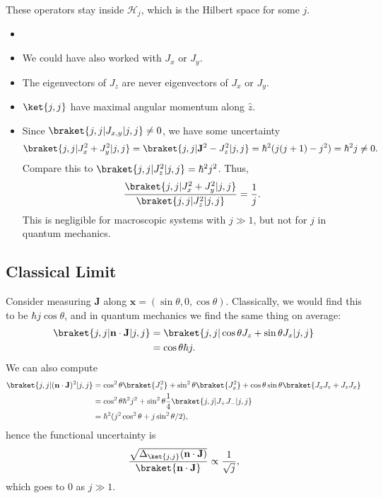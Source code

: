 \documentclass[12pt]{article}
\begin{document}
These operators stay inside $\mathcal{H}_j$, which is the Hilbert space for some $j$.

\begin{remark}
	\begin{itemize}
		\item[]
		\item We could have also worked with $J_x$ or $J_y$.
		\item The eigenvectors of $J_z$ are never eigenvectors of $J_x$ or $J_y$.
		\item $\ket{j,j}$ have maximal angular momentum along $\hat z$.
		\item Since $\braket{j,j|J_{x,y}|j,j} \neq 0$, we have some uncertainty
			\[
				\braket{j,j|J_x^2+J_y^2|j,j} = \braket{j,j|\mathbf{J}^2-J_z^2|j,j} = \hbar^2(j(j+1)-j^2) = \hbar^2j \neq 0.
			\]
			Compare this to $\braket{j,j|J_z^2|j,j} = \hbar^2 j^2$. Thus,
			\[
				\frac{\braket{j,j|J_x^2+J_y^2|j,j}}{\braket{j,j|J_z^2|j,j}} = \frac{1}{j}.
			\]
			This is negligible for macroscopic systems with $j \gg 1$, but not for $j$ in quantum mechanics.
	\end{itemize}	
\end{remark}

\subsection{Classical Limit}
\label{sub:classical_lim}

Consider measuring $\mathbf{J}$ along $\mathbf{x} = (\sin\theta, 0, \cos\theta)$. Classically, we would find this to be $\hbar j \cos \theta$, and in quantum mechanics we find the same thing on average:
\begin{align*}
	\braket{j,j|\mathbf{n} \cdot \mathbf{J} | j,j} &= \braket{j,j|\cos\theta J_z + \sin\theta J_x|j,j} \\
						       &= \cos \theta \hbar j.
\end{align*}
We can also compute
\begin{align*}
	\braket{j,j|(\mathbf{n} \cdot \mathbf{J})^2|j,j} &= \cos^2\theta \braket{J_z^2} + \sin^2\theta \braket{J_x^2} + \cos \theta \sin \theta \braket{J_xJ_z+J_zJ_x} \\
							 &= \cos^2\theta \hbar^2 j^2 + \sin^2\theta \frac{1}{4} \braket{j,j|J_{+}J_{-}|j,j} \\
							 &= \hbar^2(j^2 \cos^2\theta + j \sin^2\theta/2),
\end{align*}
hence the functional uncertainty is
\[
	\frac{\sqrt{\Delta_{\ket{j,j}}(\mathbf{n} \cdot \mathbf{J})}}{\braket{\mathbf{n} \cdot \mathbf{J}}} \propto \frac{1}{\sqrt j},
\]
which goes to $0$ as $j \gg 1$.
\end{document}
